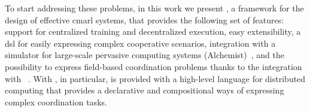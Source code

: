 To start addressing these problems, in this work we present \scarlib{}, a framework for the design of effective \ac{cmarl} systems, that 
 provides the following set of features:
 support for centralized training and decentralized execution, 
 easy extensibility, 
 a \ac{dsl} for easily expressing complex cooperative scenarios, 
 integration with a simulator for large-scale pervasive computing systems (Alchemist)~\cite{DBLP:journals/jos/PianiniMV13},
 and the possibility to express field-based coordination problems thanks to the integration with \scafi{}~\cite{Casadei2022}.
%
With \scafi{}, in particular, \scarlib{} is provided with a high-level language for distributed computing that provides a declarative
 and compositional ways of expressing complex coordination tasks. 

%
